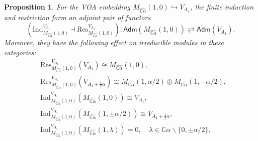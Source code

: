 \documentclass[12pt,a4paper,reqno]{amsart}
\numberwithin{equation}{section}
\numberwithin{equation}{section}
\newtheorem{prop}[thm]{Proposition}
\theoremstyle{definition}
\def \C {\mathbb{C}}
\def\la{\lambda}
\def \al{\alpha}
\def\hr{\hookrightarrow}
\def \op {\oplus}
\def\Res{\mathrm{Res}}
\def \bs {\backslash}
\def\adm{\mathsf{Adm}}
\begin{document}
	
	\begin{prop}\label{ex:inducedmodulesforHeisenberg}
		For the VOA embedding $M_{\widehat{\C\al}}(1,0)\hr V_{A_1}$, the finite induction and restriction form an adjoint pair of functors $$\left(\mathrm{Ind}_{M_{\widehat{\C\al}}(1,0)}^{V_{A_1}}\dashv \Res^{V_{A_1}}_{M_{\widehat{\C\al}}(1,0)}\right): \adm(M_{\widehat{\C\al}}(1,0))\rightleftarrows \adm(V_{A_1}).$$
		Moreover, they have the following effect on irreducible modules in these categories: 
		\begin{equation}\label{eq:rankoneHinLind}
			\begin{aligned}
				&\Res^{V_{A_1}}_{M_{\widehat{\C\al}}(1,0)}(V_{A_1})\cong M_{\widehat{\C\al}}(1,0),\\
				&\Res^{V_{A_1}}_{M_{\widehat{\C\al}}(1,0)}(V_{A_1+\frac{1}{2}\al})\cong M_{\widehat{\C\al}}(1,\al/2)\op M_{\widehat{\C\al}}(1,-\al/2),\\
				&\mathrm{Ind}_{M_{\widehat{\C\al}}(1,0)}^{V_{A_1}} (M_{\widehat{\C\al}}(1,0))\cong V_{A_1},\\
				&\mathrm{Ind}_{M_{\widehat{\C\al}}(1,0)}^{V_{A_1}} (M_{\widehat{\C\al}}(1,\pm \al/2))\cong V_{A_1+\frac{1}{2}\al},\\
				&\mathrm{Ind}_{M_{\widehat{\C\al}}(1,0)}^{V_{A_1}} (M_{\widehat{\C\al}}(1,\la))=0,\quad \la\in \C\al\bs\{0,\pm\al/2\}. 
			\end{aligned}
		\end{equation}
	\end{prop}	
\end{document}
